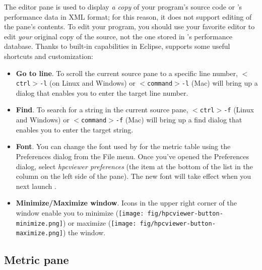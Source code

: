 The editor pane is used to display \textit{a copy} of your program's source code or \HPCToolkit{}'s performance data in XML format; for this reason, it does not support editing of the pane's contents.
To edit your program, you should use your favorite editor to edit \textit{your} original copy of the source, not the one stored in \HPCToolkit{}'s performance database.
Thanks to built-in capabilities in Eclipse, \hpcviewer{} supports some useful shortcuts and customization:
\begin{itemize}
\item \textbf{Go to line}.
  To scroll the current source pane to a specific line number, \texttt{$<$ctrl$>$-l} (on Linux and Windows) or \texttt{$<$command$>$-l} (Mac) will bring up a dialog that enables you to enter the target line number.

\item \textbf{Find}.
  To search for a string in the current source pane, \texttt{$<$ctrl$>$-f} (Linux and Windows) or \texttt{$<$command$>$-f} (Mac) will bring up a find dialog that enables you to enter the target string.

\item \textbf{Font}.
  You can change the font used by \hpcviewer{} for the metric table using the Preferences dialog from the File menu.
  Once you've opened the Preferences dialog, select \textit{hpcviewer preferences} (the item at the bottom of the list in the column on the left side of the pane).
  The new font will take effect when you next launch \hpcviewer{}.

\item \textbf{Minimize/Maximize window}.
  Icons in the upper right corner of the window enable you to minimize (\texttt{[image: fig/hpcviewer-button-minimize.png]}) or maximize (\texttt{[image: fig/hpcviewer-button-maximize.png]}) the \hpcviewer{} window.
\end{itemize}



\subsection{Metric pane}
\label{sec:hpcviewer:metric-pane}

